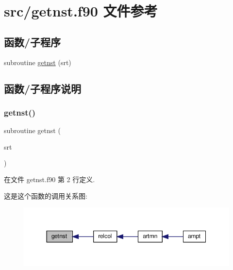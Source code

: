 \hypertarget{getnst_8f90}{}\section{src/getnst.f90 文件参考}
\label{getnst_8f90}
\subsection*{函数/子程序}
\begin{DoxyCompactItemize}
\item 
subroutine \mbox{\hyperlink{getnst_8f90_a2f7b72a025ad9ac4637e67b7d30c123b}{getnst}} (srt)
\end{DoxyCompactItemize}


\subsection{函数/子程序说明}
\mbox{\label{getnst_8f90_a2f7b72a025ad9ac4637e67b7d30c123b}} 
\subsubsection{\texorpdfstring{getnst()}{getnst()}}
{\footnotesize\ttfamily subroutine getnst (\begin{DoxyParamCaption}\item[{}]{srt }\end{DoxyParamCaption})}



在文件 getnst.\+f90 第 2 行定义.

这是这个函数的调用关系图\+:
\nopagebreak
\begin{figure}[H]
\begin{center}
\leavevmode
\includegraphics[width=350pt]{getnst_8f90_a2f7b72a025ad9ac4637e67b7d30c123b_icgraph}
\end{center}
\end{figure}
